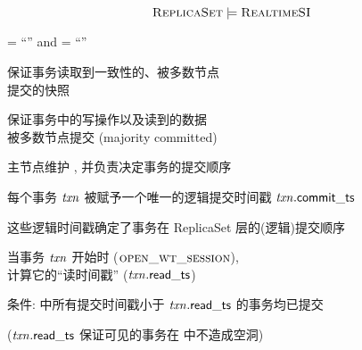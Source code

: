 
\begin{frame}{}

  \[
	\textsc{ReplicaSet} \models \textsc{RealtimeSI}
  \]
\end{frame}

\begin{frame}{}
  \begin{center}
	\rc = ``\snapshotrc'' and \wc = ``\majority''
  \end{center}

  \vspace{0.30cm}
  \begin{description}
	\setlength{\itemsep}{10pt}
	\item[\rc = ``\snapshotrc'':] 保证事务读取到一致性的、被多数节点 \\[5pt] 提交的快照
	\item[\wc = ``\majority'':] 保证事务中的写操作以及读到的数据 \\[5pt]
	  被多数节点提交 (majority committed)
  \end{description}
\end{frame}

\begin{frame}{}
  \begin{center}
	主节点维护 \oplog, 并负责决定事务的提交顺序

	\vspace{0.50cm}

	\pause
	\vspace{0.50cm}
	每个事务 $\mathit{txn}$ 被赋予一个唯一的逻辑提交时间戳 $\mathit{txn}.{\sf commit\_ts}$

	\vspace{0.50cm}
	这些逻辑时间戳确定了事务在 ReplicaSet 层的(逻辑)提交顺序
  \end{center}
\end{frame}

\begin{frame}{}
  \begin{center}
	当事务 $\mathit{txn}$ 开始时 ($\textsc{open\_wt\_session}$), \\[5pt]
	计算它的``读时间戳'' ($\mathit{txn}.{\sf read\_ts}$)

	\vspace{0.50cm}

	\vspace{0.50cm}
	条件: \oplog{} 中所有提交时间戳小于 $\mathit{txn}.{\sf read\_ts}$ 的事务均已提交

	\vspace{0.30cm}
	($\mathit{txn}.{\sf read\_ts}$ 保证可见的事务在 \oplog{} 中不造成空洞)
  \end{center}
\end{frame}

